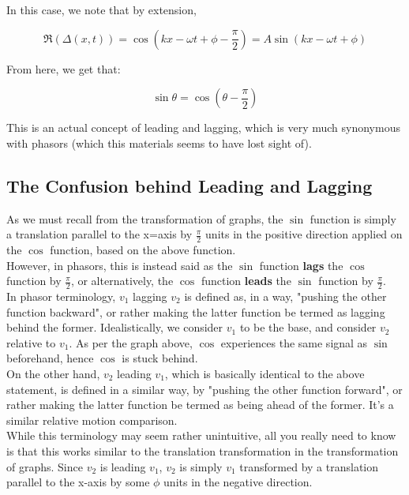 \documentclass[a4paper,12pt,oneside]{book}
\begin{document}
In this case, we note that by extension,

\[ \Re{\left(\Delta(x, t)\right)} = \cos \left(kx - \omega t + \phi - \frac{\pi}{2} \right) = A \sin(kx - \omega t + \phi) \]

From here, we get that:

\[ \sin\theta = \cos \left(\theta - \frac{\pi}{2} \right) \]

This is an actual concept of leading and lagging, which is very much synonymous with phasors (which this materials seems to have lost sight of).

\subsection{The Confusion behind Leading and Lagging}

As we must recall from the transformation of graphs, the $\sin$ function is simply a translation parallel to the x=axis by $\frac{\pi}{2}$ units in the positive direction applied on the $\cos$ function, based on the above function. \\

However, in phasors, this is instead said as the $\sin$ function \textbf{lags} the $\cos$ function by $\frac{\pi}{2}$, or alternatively, the $\cos$ function \textbf{leads} the $\sin$ function by $\frac{\pi}{2}$. \\

In phasor terminology, $v_1$ lagging $v_2$ is defined as, in a way, "pushing the other function backward", or rather making the latter function be termed as lagging behind the former. Idealistically, we consider $v_1$ to be the base, and consider $v_2$ relative to $v_1$. As per the graph above, $\cos$ experiences the same signal as $\sin$ beforehand, hence $\cos$ is stuck behind. \\

On the other hand, $v_2$ leading $v_1$, which is basically identical to the above statement, is defined in a similar way, by "pushing the other function forward", or rather making the latter function be termed as being ahead of the former. It's a similar relative motion comparison. \\

While this terminology may seem rather unintuitive, all you really need to know is that this works similar to the translation transformation in the transformation of graphs. Since $v_2$ is leading $v_1$,  $v_2$ is simply $v_1$ transformed by a translation parallel to the x-axis by some $\phi$ units in the negative direction.
\end{document}
